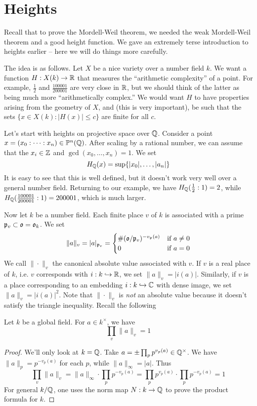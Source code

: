 \documentclass{article}
\begin{document}
\section{Heights}

Recall that to prove the Mordell-Weil theorem, we needed the weak Mordell-Weil 
theorem and a good height function. We gave an extremely terse introduction to 
heights earlier -- here we will do things more carefully. 

The idea is as follows. Let $X$ be a nice variety over a number field $k$. We 
want a function $H:X(k)\to \mathbb{R}$ that measures the ``arithmetic complexity'' of 
a point. For example, $\frac 1 2$ and $\frac{100001}{200001}$ are very close in 
$\mathbb{R}$, but we should think of the latter as being much more ``arithmetically 
complex.'' We would want $H$ to have properties arising from the geometry of 
$X$, and (this is very important), be such that the sets 
$\{x\in X(k):|H(x)|\leqslant c\}$ are finite for all $c$. 

Let's start with heights on projective space over $\mathbb{Q}$. Consider a point 
$x=(x_0:\cdots:x_n)\in \mathbb{P}^n(\mathbb{Q})$. After scaling by a rational number, we can 
assume that the $x_i\in \mathbb{Z}$ and $\gcd(x_0,\dots,x_n)=1$. We set 
\[
  H_{\mathbb{Q}}(x) = \sup\{|x_0|,\dots,|a_n|\}
\]
It is easy to see that this is well defined, but it doesn't work very well over 
a general number field. Returning to our example, we have 
$H_{\mathbb{Q}}(\frac 1 2:1)=2$, while $H_{\mathbb{Q}}(\frac{100001}{200001}:1)=200001$, which is 
much larger. 

Now let $k$ be a number field. Each finite place $v$ of $k$ is associated with 
a prime $\mathfrak{p}_v\subset \mathfrak{o}=\mathfrak{o}_k$. We set 
\[
  \|a\|_v = |a|_{\mathfrak{p}_v} 
        = \begin{cases}
            \#(\mathfrak{o}/\mathfrak{p}_v)^{-v_{\mathfrak{p}}(a)} & \text{if $a\ne 0$} \\
            0                         & \text{if $a=0$}
          \end{cases}
\]
We call $\|\cdot\|_v$ the canonical absolute value associated with $v$. If $v$ 
is a real place of $k$, i.e. $v$ corresponds with $i:k\hookrightarrow \mathbb{R}$, we 
set $\|a\|_v = |i(a)|$. Similarly, if $v$ is a place corresponding to an 
embedding $i:k\hookrightarrow \mathbb{C}$ with dense image, we set 
$\|a\|_v=|i(a)|^2$. Note that $\|\cdot\|_v$ is \emph{not} an absolute value 
because it doesn't satisfy the triangle inequality. Recall the following 

\begin{theorem}
Let $k$ be a global field. For $a\in k^\times$, we have 
\[
  \prod_v \|a\|_v = 1
\]
\end{theorem}
\begin{proof}
We'll only look at $k=\mathbb{Q}$. Take $a=\pm \prod_p p^{v_p(a)}\in \mathbb{Q}^\times$. We 
have $\|a\|_p=p^{-v_p(a)}$ for each $p$, while $\|a\|_\infty = |a|$. Thus
\[
  \prod_v \|a\|_v = \|a\|_\infty\cdot \prod_p p^{-v_p(a)}  = \prod_p p^{v_p(a)}\cdot \prod_p p^{-v_p(a)} = 1
\]
For general $k/\mathbb{Q}$, one uses the norm map $N:k\to \mathbb{Q}$ to prove the product 
formula for $k$.
\end{proof}
\end{document}
